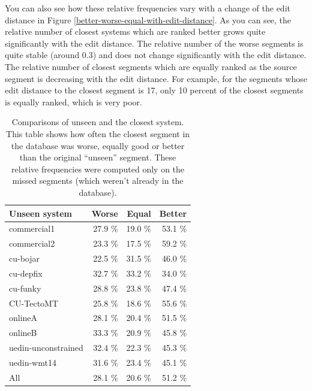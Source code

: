 You can also see how these relative frequencies vary with a change of the edit
distance in Figure \ref{better-worse-equal-with-edit-distance}.  As you can
see, the relative number of closest systems which are ranked better grows quite
significantly with the edit distance. The relative number of the worse segments
is quite stable (around 0.3) and does not change significantly with the edit
distance. The relative number of closest segments which are equally ranked as
the source segment is decreasing with the edit distance. For example, for the
segments whose edit distance to the closest segment is 17, only 10 percent of
the closest segments is equally ranked, which is very poor. 



\begin{table}
  \centering
\begin{tabular}{|lrrr|}
  \hline
  \textbf{Unseen system}            &   \textbf{Worse} &   \textbf{Equal} &   \textbf{Better} \\
  \hline
   commercial1         &   27.9 \% &   19.0 \% &    53.1 \% \\
   commercial2         &   23.3 \% &   17.5 \% &    59.2 \% \\
   cu-bojar            &   22.5 \% &   31.5 \% &    46.0 \% \\
   cu-depfix           &   32.7 \% &   33.2 \% &    34.0 \% \\
   cu-funky            &   28.8 \% &   23.8 \% &    47.4 \% \\
   CU-TectoMT          &   25.8 \% &   18.6 \% &    55.6 \% \\
   onlineA             &   28.1 \% &   20.4 \% &    51.5 \% \\
   onlineB             &   33.3 \% &   20.9 \% &    45.8 \% \\
   uedin-unconstrained &   32.4 \% &   22.3 \% &    45.3 \% \\
   uedin-wmt14         &   31.6 \% &   23.4 \% &    45.1 \% \\
  \hline
   All               &   28.1 \% &   20.6 \% &    51.2 \% \\
  \hline
\end{tabular}

\caption[Comparisons of unseen and the closest systems]{Comparisons of unseen
and the closest system. This table shows how often the closest segment in the
database was worse, equally good or better than the original ``unseen''
segment. These relative frequencies were computed only on the missed segments
(which weren't already in the database).}

  \label{edit-distance-matching-analysis}
\end{table}

